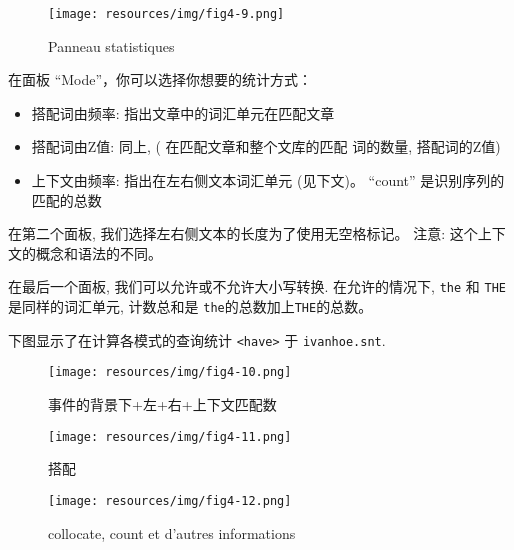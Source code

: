 \bigskip
\begin{figure}[!h]
\begin{center}
\texttt{[image: resources/img/fig4-9.png]}
\caption{Panneau statistiques \label{fig-statistics}}
\end{center}
\end{figure}

\bigskip
\noindent 在面板 ``Mode''，你可以选择你想要的统计方式： 
\begin{itemize}
  \item 搭配词由频率: 指出文章中的词汇单元在匹配文章
  \item 搭配词由Z值: 同上,  ( 在匹配文章和整个文库的匹配
  词的数量, 搭配词的Z值)
  \item 上下文由频率: 指出在左右侧文本词汇单元 (见下文)。 ``count'' 是识别序列的匹配的总数
\end{itemize}

\bigskip
\noindent 在第二个面板, 我们选择左右侧文本的长度为了使用无空格标记。
注意: 这个上下文的概念和语法的不同。


\bigskip
\noindent 在最后一个面板, 我们可以允许或不允许大小写转换.
在允许的情况下, \verb$the$ 和 \verb$THE$ 是同样的词汇单元, 计数总和是 \verb$the$的总数加上\verb$THE$的总数。

\bigskip
\noindent 下图显示了在计算各模式的查询统计
\verb$<have>$ 于 \verb$ivanhoe.snt$.


\bigskip
\begin{figure}[!h]
\begin{center}
\texttt{[image: resources/img/fig4-10.png]}
\caption{事件的背景下+左+右+上下文匹配数\label{fig-statistics-mode0}}
\end{center}
\end{figure}

\begin{figure}[!h]
\begin{center}
\texttt{[image: resources/img/fig4-11.png]}
\caption{搭配\label{fig-statistics-mode1}}
\end{center}
\end{figure}

\begin{figure}[!h]
\begin{center}
\texttt{[image: resources/img/fig4-12.png]}
\caption{collocate, count et d'autres informations\label{fig-statistics-mode2}}
\end{center}
\end{figure}
